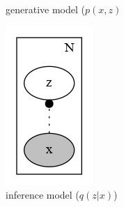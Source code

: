 \documentclass[11pt, a4paper]{report}
\theoremstyle{plain}
\theoremstyle{definition}
\theoremstyle{remark}
\begin{document}
\begin{figure}[h]
\begin{subfigure}[b]{0.2\textwidth}
\caption{generative model ($p(x,z)$}
\end{subfigure}
\begin{subfigure}[b]{0.2\textwidth}
\includegraphics[width=\textwidth]{plots/vae_q.gv.png}
\caption{inference model ($q(z|x)$)}
\end{subfigure}
\begin{subfigure}[b]{0.2\textwidth}

\end{subfigure}
\end{figure}
\end{document}
